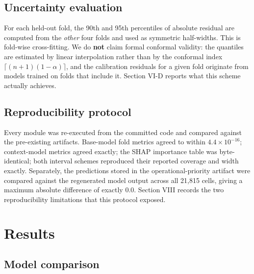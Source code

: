 \subsection{Uncertainty evaluation}\label{c.-uncertainty-evaluation}

For each held-out fold, the 90th and 95th percentiles of absolute residual are computed from the
\emph{other} four folds and used as symmetric half-widths. This is fold-wise cross-fitting. We do \textbf{not}
claim formal conformal validity: the quantiles are estimated by linear interpolation rather than by
the conformal index \(\lceil (n+1)(1 - \alpha) \rceil\), and the calibration residuals for a given fold
originate from models trained on folds that include it. Section VI-D reports what this scheme
actually achieves.

\subsection{Reproducibility protocol}\label{d.-reproducibility-protocol}

Every module was re-executed from the committed code and compared against the pre-existing
artifacts. Base-model fold metrics agreed to within \(4.4 \times 10^{-16}\); context-model metrics
agreed exactly; the SHAP importance table was byte-identical; both interval schemes reproduced their
reported coverage and width exactly. Separately, the predictions stored in the operational-priority
artifact were compared against the regenerated model output across all 21,815 cells, giving a
maximum absolute difference of exactly 0.0. Section VIII records the two reproducibility
limitations that this protocol exposed.

\section{Results}\label{vi.-results}

\subsection{Model comparison}\label{a.-model-comparison}

